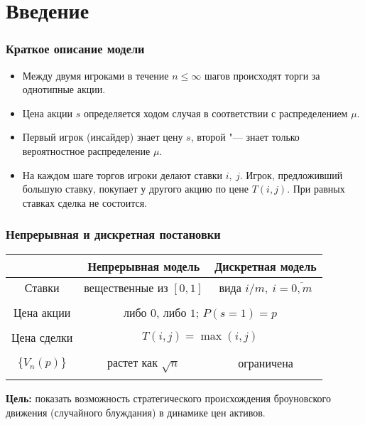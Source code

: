 \documentclass[12pt]{beamer}
\title{\small{\thesisTitle}}
\author{\small{%
\emph{Выступающий:}~\thesisAuthorShort\\%
\emph{Руководитель:}~\supervisorRegaliaShort~\supervisorFioShort}\\%
\vspace{30pt}%
\thesisOrganization%
\vspace{20pt}%
}
\date{\small{\thesisCity, \thesisYear}}
\begin{document}
\maketitle

\section{Введение}

\begin{frame}
  \frametitle{Краткое описание модели}
  \begin{itemize}
  \item
    Между двумя игроками в течение $n \leqslant \infty$ шагов происходят
    торги за однотипные акции.
  \item
    Цена акции $s$ определяется ходом случая в соответствии с распределением $\mu$.
  \item
    Первый игрок (инсайдер) знает цену $s$, второй "--- знает только вероятностное распределение $\mu$.
  \item
    На каждом шаге торгов игроки делают ставки $i,\ j$.
    Игрок, предложивший большую ставку, покупает у другого акцию по цене $T(i, j)$.
    При равных ставках сделка не состоится.
  \end{itemize}
\end{frame}

\begin{frame}
  \frametitle{Непрерывная и дискретная постановки}
  
  \begin{tabular}{c|c|c}
    & Непрерывная модель & Дискретная модель \\
    \midrule
    Ставки & вещественные из $[0, 1]$ & вида $i/m,\ i = \overline{0, m}$ \\
    \hline \\
    Цена акции& \multicolumn{2}{c}{либо $0$, либо $1$; $P(s = 1) = p$} \\
    \hline \\
    Цена сделки& \multicolumn{2}{c}{$T(i, j) = \max(i, j)$} \\
    \hline \\
    $\{V_n(p)\}$ & растет как $\sqrt{n}$ & ограничена \\
    \bottomrule \\
  \end{tabular}

  \textbf{Цель:} показать возможность стратегического происхождения броуновского движения (случайного блуждания) в динамике цен активов.
\end{frame}
\end{document}
